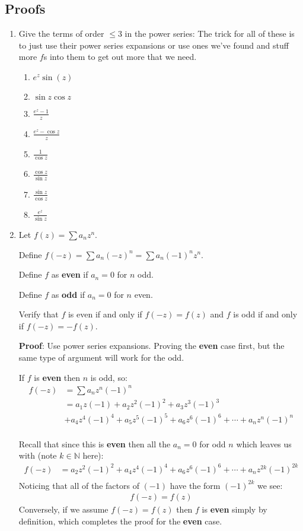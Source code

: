 \subsection{Proofs}
\begin{enumerate}

    \item Give the terms of order $\leq 3$ in the power series:
    The trick for all of these is to just use their power series expansions or use ones we've found and stuff more $f$s into them 
    to get out more that we need.
    \begin{enumerate}
      \item $e^z \sin(z)$
      \item $\sin z \cos z$
      \item $\frac{e^z - 1}{z}$
      \item $\frac{e^z - \cos z}{z}$
      \item $\frac{1}{\cos z}$
      \item $\frac{\cos z}{\sin z}$
      \item $\frac{\sin z}{\cos z}$
      \item $\frac{e^z}{\sin z}$
    \end{enumerate}
    
    \item Let $f(z) = \sum a_n z^n$.
  
    Define $f(-z) = \sum a_n (-z)^n = \sum a_n(-1)^n z^n$.
  
    Define $f$ as \textbf{even} if $a_n = 0$ for $n$ odd.
  
    Define $f$ as \textbf{odd} if $a_n = 0$ for $n$ even.
  
    Verify that $f$ is even if and only if $f(-z) = f(z)$ and $f$ is odd if and only if $f(-z) = -f(z).$
  
    \textbf{Proof}:
    Use power series expansions. Proving the \textbf{even} case first, but the same type of argument will work for the odd.
  
    If $f$ is \textbf{even} then $n$ is odd, so:
    \begin{align*}
      f(-z) &= \sum a_n z^n (-1)^n \\
      &= a_1 z (-1) + a_2 z^2 (-1)^2 + a_3 z^3 (-1)^3 \\
      &+ a_4 z^4 (-1)^4 + a_5 z^5 (-1)^5 + a_6 z^6 (-1)^6 + \cdots + a_n z^n (-1)^n \\
    \end{align*}
  
    Recall that since this is \textbf{even} then all the $a_n = 0$ for odd $n$ which leaves us 
    with (note $k \in \mathbb{N}$ here):
    \begin{align*}
      f(-z) &= a_2 z^2 (-1)^2 + a_4 z^4 (-1)^4 + a_6 z^6 (-1)^6 + \cdots + a_n z^{2k} (-1)^{2k} \\
    \end{align*} 
    Noticing that all of the factors of $(-1)$ have the form $(-1)^{2k}$ we see:
    \begin{align*}
      f(-z) = f(z)
    \end{align*}
    Conversely, if we assume $f(-z) = f(z)$ then $f$ is \textbf{even} simply by definition, 
    which completes the proof for the \textbf{even} case. 
    

\end{enumerate}
